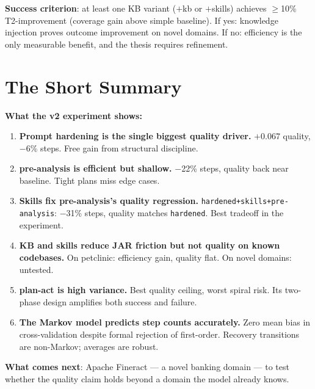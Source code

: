 \documentclass[11pt,a4paper]{article}
\begin{document}
\textbf{Success criterion}: at least one KB variant ($+$kb or $+$skills)
achieves $\geq$10\% T2-improvement (coverage gain above simple baseline).
If yes: knowledge injection proves outcome improvement on novel domains.
If no: efficiency is the only measurable benefit, and the thesis requires refinement.

\section{The Short Summary}

\begin{keybox}
\textbf{What the v2 experiment shows:}

\begin{enumerate}[leftmargin=1.5em,itemsep=4pt]
  \item \textbf{Prompt hardening is the single biggest quality driver.}
    $+$0.067 quality, $-$6\% steps. Free gain from structural discipline.

  \item \textbf{pre-analysis is efficient but shallow.}
    $-$22\% steps, quality back near baseline.
    Tight plans miss edge cases.

  \item \textbf{Skills fix pre-analysis's quality regression.}
    \texttt{hardened+skills+pre-analysis}: $-$31\% steps, quality matches \texttt{hardened}.
    Best tradeoff in the experiment.

  \item \textbf{KB and skills reduce JAR friction but not quality on known codebases.}
    On petclinic: efficiency gain, quality flat.
    On novel domains: untested.

  \item \textbf{plan-act is high variance.}
    Best quality ceiling, worst spiral risk.
    Its two-phase design amplifies both success and failure.

  \item \textbf{The Markov model predicts step counts accurately.}
    Zero mean bias in cross-validation despite formal rejection of first-order.
    Recovery transitions are non-Markov; averages are robust.
\end{enumerate}

\vspace{6pt}
\textbf{What comes next}: Apache Fineract --- a novel banking domain ---
to test whether the quality claim holds beyond a domain the model already knows.
\end{keybox}
\end{document}

